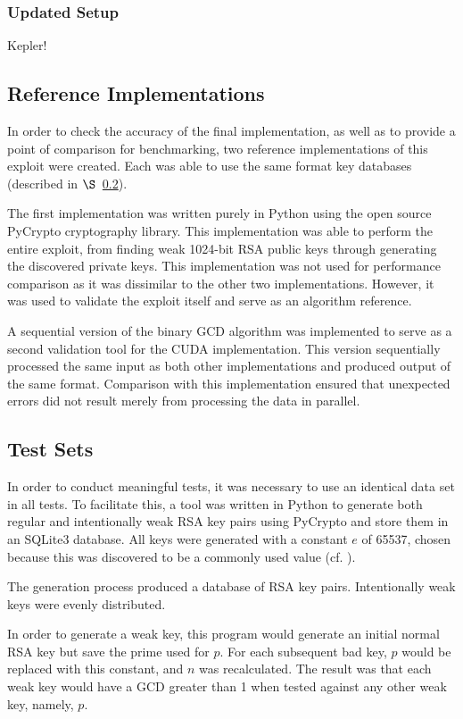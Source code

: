 \documentclass[smallextended]{svjour3}       %
\begin{document}
\subsubsection{Updated Setup}
\label{subsubsec:updatedsetup}
Kepler!

\subsection{Reference Implementations}
\label{subsec:refimpl}
In order to check the accuracy of the final implementation, as well as to 
provide a point of comparison for benchmarking, two reference implementations 
of this exploit were created. Each was able to use the same format key 
databases (described in $\S$~\ref{subsec:testsets}). 

The first implementation was written purely in Python using the open source
PyCrypto cryptography library. This implementation was able to perform the
entire exploit, from finding weak 1024-bit RSA public keys through generating
the discovered private keys. This implementation was not used for performance
comparison as it was dissimilar to the other two implementations. However, it
was used to validate the exploit itself and serve as an algorithm reference.

A sequential version of the binary GCD algorithm was implemented to serve as a 
second validation tool for the CUDA implementation. This version sequentially 
processed the same input as both other implementations and produced output of
the same format. Comparison with this implementation ensured that unexpected
errors did not result merely from processing the data in parallel.

\subsection{Test Sets}
\label{subsec:testsets}
In order to conduct meaningful tests, it was necessary to use an identical 
data set in all tests. To facilitate this, a tool was written in Python to 
generate both regular and intentionally weak RSA key pairs using PyCrypto and
store them in an SQLite3 database. All keys were generated with a 
constant $e$ of 65537, chosen because this was discovered to be a commonly used 
value (cf. \cite{lenstra2012ron}).

The generation process produced a database of RSA key pairs. 
Intentionally weak keys were evenly distributed. 

In order to generate a weak key, this program would generate an initial 
normal RSA key but save the prime used for $p$. For each subsequent bad key, 
$p$ would be replaced with this constant, and $n$ was recalculated. The 
result was that each weak key would have a GCD greater than 1 when 
tested against any other weak key, namely, $p$. 
\end{document}
